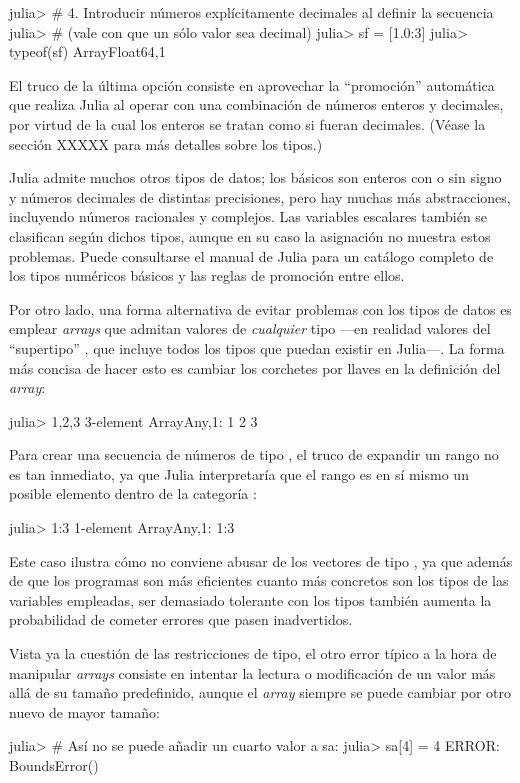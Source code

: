 ﻿\documentclass[spanish]{article}
\begin{document}
julia> # 4. Introducir números explícitamente decimales al definir la secuencia
julia> # (vale con que un sólo valor sea decimal)
julia> sf = [1.0:3]
julia> typeof(sf)
Array{Float64,1}

El truco de la última opción consiste en aprovechar la ``promoción'' automática que realiza Julia al operar con una combinación de números enteros y decimales, por virtud de la cual los enteros se tratan como si fueran decimales. (Véase la sección XXXXX para más detalles sobre los tipos.)

Julia admite muchos otros tipos de datos; los básicos son enteros con o sin signo y números decimales de distintas precisiones, pero hay muchas más abstracciones, incluyendo números racionales y complejos. Las variables escalares también se clasifican según dichos tipos, aunque en su caso la asignación no muestra estos problemas. Puede consultarse el manual de Julia para un catálogo completo de los tipos numéricos básicos y las reglas de promoción entre ellos.

Por otro lado, una forma alternativa de evitar problemas con los tipos de datos es emplear \emph{arrays} que admitan valores de \emph{cualquier} tipo ---en realidad valores del ``supertipo'' , que incluye todos los tipos que puedan existir en Julia---. La forma más concisa de hacer esto es cambiar los corchetes por llaves en la definición del \emph{array}:

julia> {1,2,3}
3-element Array{Any,1}:
 1
 2
 3

Para crear una secuencia de números de tipo , el truco de expandir un rango no es tan inmediato, ya que Julia interpretaría que el rango es en sí mismo un posible elemento dentro de la categoría :

julia> {1:3}
1-element Array{Any,1}:
 1:3

Este caso ilustra cómo no conviene abusar de los vectores de tipo , ya que además de que los programas son más eficientes cuanto más concretos son los tipos de las variables empleadas, ser demasiado tolerante con los tipos también aumenta la probabilidad de cometer errores que pasen inadvertidos.

Vista ya la cuestión de las restricciones de tipo, el otro error típico a la hora de manipular \emph{arrays} consiste en intentar la lectura o modificación de un valor más allá de su tamaño predefinido, aunque el \emph{array} siempre se puede cambiar por otro nuevo de mayor tamaño:

julia> # Así no se puede añadir un cuarto valor a sa:
julia> sa[4] = 4
ERROR: BoundsError()
\end{document}
